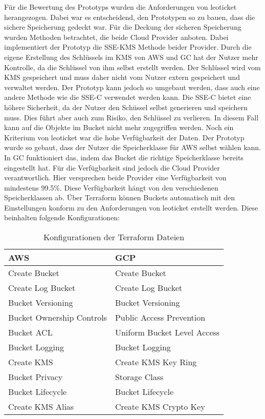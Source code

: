 Für die Bewertung des Prototyps wurden die Anforderungen von leoticket herangezogen. Dabei war es entscheidend, den Prototypen so zu bauen, dass die sichere Speicherung gedeckt war. Für die Deckung der sicheren Speicherung wurden Methoden betrachtet, die beide Cloud Provider anboten. Dabei implementiert der Prototyp die SSE-KMS Methode beider Provider. Durch die eigene Erstellung des Schlüssels im KMS von AWS und GC hat der Nutzer mehr Kontrolle, da die Schlüssel von ihm selbst erstellt werden. Der Schlüssel wird vom KMS gespeichert und muss daher nicht vom Nutzer extern gespeichert und verwaltet werden. Der Prototyp kann jedoch so umgebaut werden, dass auch eine andere Methode wie die SSE-C verwendet werden kann. Die SSE-C bietet eine höhere Sicherheit, da der Nutzer den Schüssel selbst generieren und speichern muss. Dies führt aber auch zum Risiko, den Schlüssel zu verlieren. In diesem Fall kann auf die Objekte im Bucket nicht mehr zugegriffen werden. Noch ein Kriterium von leoticket war die hohe Verfügbarkeit der Daten. Der Prototyp wurde so gebaut, dass der Nutzer die Speicherklasse für AWS selbst wählen kann. In GC funktioniert das, indem das Bucket die richtige Speicherklasse bereits eingestellt hat. Für die Verfügbarkeit sind jedoch die Cloud Provider verantwortlich. Hier versprechen beide Provider eine Verfügbarkeit von mindestens 99.5\%. Diese Verfügbarkeit hängt von den verschiedenen Speicherklassen ab. Über Terraform können Buckets automatisch mit den Einstellungen konform zu den Anforderungen von leoticket erstellt werden. Diese beinhalten folgende Konfigurationen:\\

\begin{table}[!h]
\centering
\begin{tabular}{ |p{5cm}|p{5cm}| }
\hline
AWS & GCP \\
\hline
\cline{1-2}
Create Bucket & Create Bucket \\
\cline{1-2}
Create Log Bucket & Create Log Bucket\\
\cline{1-2}
Bucket Versioning & Bucket Versioning \\
\cline{1-2}
Bucket Ownership Controls &  Public Access Prevention \\
\cline{1-2}
Bucket ACL & Uniform Bucket Level Access \\
\cline{1-2}
Bucket Logging & Bucket Logging \\
\cline{1-2}
Create KMS & Create KMS Key Ring \\
\cline{1-2}
Bucket Privacy & Storage Class\\
\cline{1-2}
Bucket Lifecycle & Bucket Lifecycle \\
\cline{1-2}
Create KMS Alias & Create KMS Crypto Key \\
\cline{1-2}
\end{tabular}
\caption{Konfigurationen der Terraform Dateien}
\end{table}

